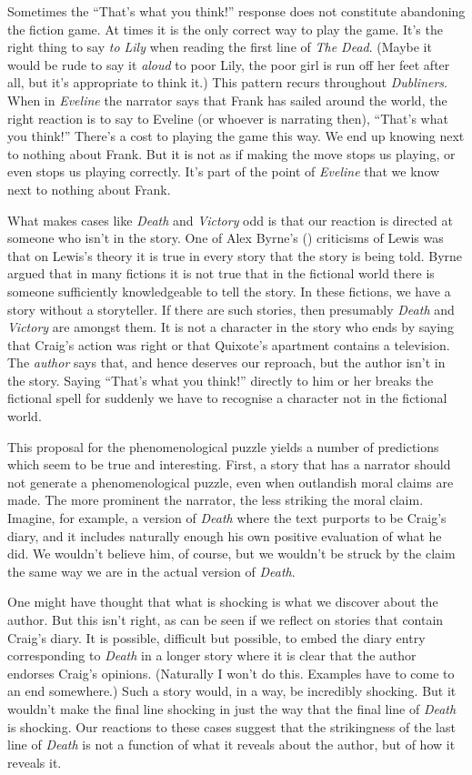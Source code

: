 \documentclass[
  11pt,
  letterpaper,
  DIV=11,
  numbers=noendperiod,
  twoside]{scrartcl}
\begin{document}
Sometimes the ``That's what you think!'' response does not constitute
abandoning the fiction game. At times it is the only correct way to play
the game. It's the right thing to say \emph{to Lily} when reading the
first line of \emph{The Dead}. (Maybe it would be rude to say it
\emph{aloud} to poor Lily, the poor girl is run off her feet after all,
but it's appropriate to think it.) This pattern recurs throughout
\emph{Dubliners}. When in \emph{Eveline} the narrator says that Frank
has sailed around the world, the right reaction is to say to Eveline (or
whoever is narrating then), ``That's what you think!'' There's a cost to
playing the game this way. We end up knowing next to nothing about
Frank. But it is not as if making the move stops us playing, or even
stops us playing correctly. It's part of the point of \emph{Eveline}
that we know next to nothing about Frank.

What makes cases like \emph{Death} and \emph{Victory} odd is that our
reaction is directed at someone who isn't in the story. One of Alex
Byrne's () criticisms of Lewis was that on
Lewis's theory it is true in every story that the story is being told.
Byrne argued that in many fictions it is not true that in the fictional
world there is someone sufficiently knowledgeable to tell the story. In
these fictions, we have a story without a storyteller. If there are such
stories, then presumably \emph{Death} and \emph{Victory} are amongst
them. It is not a character in the story who ends by saying that Craig's
action was right or that Quixote's apartment contains a television. The
\emph{author} says that, and hence deserves our reproach, but the author
isn't in the story. Saying ``That's what you think!'' directly to him or
her breaks the fictional spell for suddenly we have to recognise a
character not in the fictional world.

This proposal for the phenomenological puzzle yields a number of
predictions which seem to be true and interesting. First, a story that
has a narrator should not generate a phenomenological puzzle, even when
outlandish moral claims are made. The more prominent the narrator, the
less striking the moral claim. Imagine, for example, a version of
\emph{Death} where the text purports to be Craig's diary, and it
includes naturally enough his own positive evaluation of what he did. We
wouldn't believe him, of course, but we wouldn't be struck by the claim
the same way we are in the actual version of \emph{Death}.

One might have thought that what is shocking is what we discover about
the author. But this isn't right, as can be seen if we reflect on
stories that contain Craig's diary. It is possible, difficult but
possible, to embed the diary entry corresponding to \emph{Death} in a
longer story where it is clear that the author endorses Craig's
opinions. (Naturally I won't do this. Examples have to come to an end
somewhere.) Such a story would, in a way, be incredibly shocking. But it
wouldn't make the final line shocking in just the way that the final
line of \emph{Death} is shocking. Our reactions to these cases suggest
that the strikingness of the last line of \emph{Death} is not a function
of what it reveals about the author, but of how it reveals it.
\end{document}
